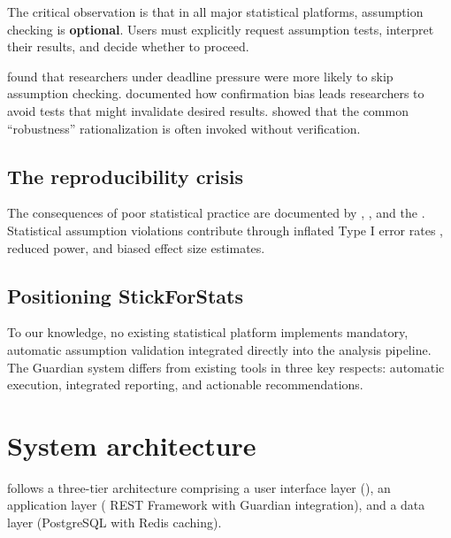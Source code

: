 \documentclass[article]{jss}
\begin{document}
The critical observation is that in all major statistical platforms, assumption checking is \textbf{optional}. Users must explicitly request assumption tests, interpret their results, and decide whether to proceed.

\citet{hoekstra2012assumptions} found that researchers under deadline pressure were more likely to skip assumption checking. \citet{nickerson1998confirmation} documented how confirmation bias leads researchers to avoid tests that might invalidate desired results. \citet{zimmerman2004note} showed that the common ``robustness'' rationalization is often invoked without verification.

\subsection{The reproducibility crisis}

The consequences of poor statistical practice are documented by \citet{baker2016reproducibility}, \citet{ioannidis2005why}, and the \citet{osc2015reproducibility}. Statistical assumption violations contribute through inflated Type I error rates \citep{wilcox2012robust}, reduced power, and biased effect size estimates.

\subsection{Positioning StickForStats}

To our knowledge, no existing statistical platform implements mandatory, automatic assumption validation integrated directly into the analysis pipeline. The Guardian system differs from existing tools in three key respects: automatic execution, integrated reporting, and actionable recommendations.


\section{System architecture} \label{sec:architecture}


 follows a three-tier architecture comprising a user interface layer (), an application layer ( REST Framework with Guardian integration), and a data layer (PostgreSQL with Redis caching).
\end{document}

